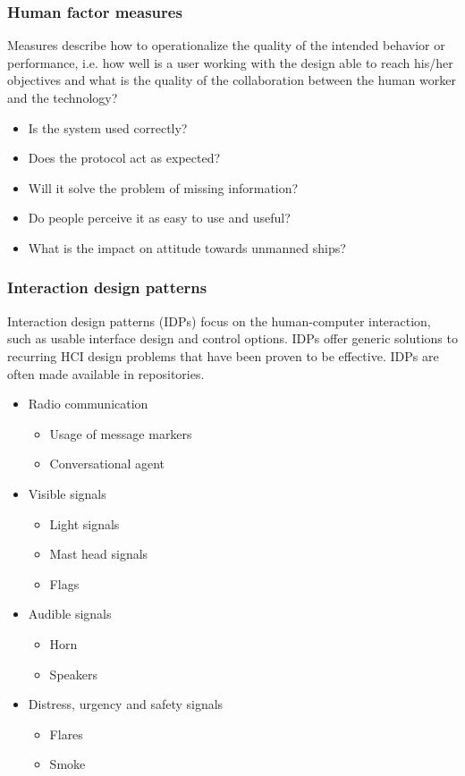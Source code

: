 \subsubsection{Human factor measures}
Measures describe how to operationalize the quality of the intended behavior or performance, i.e. how well is a user working with the design able to reach his/her objectives and what is the quality of the collaboration between the human worker and the technology?
\begin{itemize}
	\item Is the system used correctly?
	\item Does the protocol act as expected?
	\item Will it solve the problem of missing information?
	\item Do people perceive it as easy to use and useful?
	\item What is the impact on attitude towards unmanned ships?
\end{itemize}

\subsubsection{Interaction design patterns}
Interaction design patterns (IDPs) focus on the human-computer interaction, such as usable interface design and control options. IDPs offer generic solutions to recurring HCI design problems that have been proven to be effective. IDPs are often made available in repositories.

\begin{itemize}
	\item Radio communication
	\begin{itemize}
		\item Usage of message markers
		\item Conversational agent
	\end{itemize}
	\item Visible signals
	\begin{itemize}
		\item Light signals
		\item Mast head signals
		\item Flags
	\end{itemize}
	\item Audible signals
	\begin{itemize}
		\item Horn
		\item Speakers
	\end{itemize}
	\item Distress, urgency and safety signals
	\begin{itemize}
		\item Flares
		\item Smoke
	\end{itemize}
\end{itemize}

